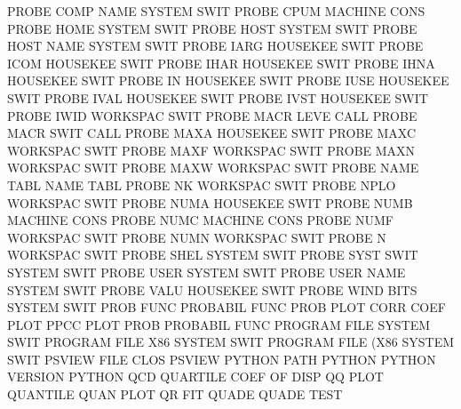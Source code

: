 PROBE    COMP NAME                      SYSTEM   SWIT
PROBE    CPUM                           MACHINE  CONS
PROBE    HOME                           SYSTEM   SWIT
PROBE    HOST                           SYSTEM   SWIT
PROBE    HOST NAME                      SYSTEM   SWIT
PROBE    IARG                           HOUSEKEE SWIT
PROBE    ICOM                           HOUSEKEE SWIT
PROBE    IHAR                           HOUSEKEE SWIT
PROBE    IHNA                           HOUSEKEE SWIT
PROBE    IN                             HOUSEKEE SWIT
PROBE    IUSE                           HOUSEKEE SWIT
PROBE    IVAL                           HOUSEKEE SWIT
PROBE    IVST                           HOUSEKEE SWIT
PROBE    IWID                           WORKSPAC SWIT
PROBE    MACR LEVE                      CALL
PROBE    MACR SWIT                      CALL
PROBE    MAXA                           HOUSEKEE SWIT
PROBE    MAXC                           WORKSPAC SWIT
PROBE    MAXF                           WORKSPAC SWIT
PROBE    MAXN                           WORKSPAC SWIT
PROBE    MAXW                           WORKSPAC SWIT
PROBE    NAME TABL                      NAME     TABL
PROBE    NK                             WORKSPAC SWIT
PROBE    NPLO                           WORKSPAC SWIT
PROBE    NUMA                           HOUSEKEE SWIT
PROBE    NUMB                           MACHINE  CONS
PROBE    NUMC                           MACHINE  CONS
PROBE    NUMF                           WORKSPAC SWIT
PROBE    NUMN                           WORKSPAC SWIT
PROBE    N                              WORKSPAC SWIT
PROBE    SHEL                           SYSTEM   SWIT
PROBE    SYST SWIT                      SYSTEM   SWIT
PROBE    USER                           SYSTEM   SWIT
PROBE    USER NAME                      SYSTEM   SWIT
PROBE    VALU                           HOUSEKEE SWIT
PROBE    WIND BITS                      SYSTEM   SWIT
PROB     FUNC                           PROBABIL FUNC
PROB     PLOT CORR COEF PLOT            PPCC     PLOT
PROB                                    PROBABIL FUNC
PROGRAM  FILE                           SYSTEM   SWIT
PROGRAM  FILE X86                       SYSTEM   SWIT
PROGRAM  FILE (X86                      SYSTEM   SWIT
PSVIEW   FILE CLOS                      PSVIEW
PYTHON   PATH                           PYTHON
PYTHON   VERSION                        PYTHON
QCD                                     QUARTILE COEF OF   DISP
QQ       PLOT                           QUANTILE QUAN PLOT
QR                                      FIT
QUADE                                   QUADE    TEST
